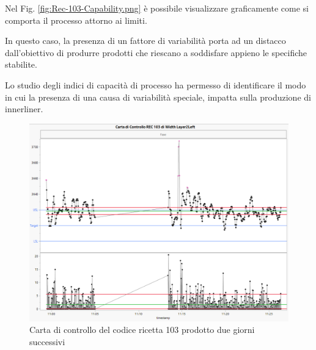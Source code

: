 Nel Fig. \ref{fig:Rec-103-Capability.png} è possibile visualizzare graficamente come si comporta il processo attorno ai limiti.

In questo caso, la presenza di un fattore di variabilità porta ad un distacco dall'obiettivo di produrre prodotti che riescano a soddisfare appieno le specifiche stabilite.

Lo studio degli indici di capacità di processo ha permesso di identificare il modo in cui la presenza di una causa di variabilità speciale, impatta sulla produzione di innerliner.

\clearpage
\begin{figure}[h]
  \centering
  \includegraphics[width=1 \textwidth]{img/Rec-103-ControlChart.png}
  \caption{Carta di controllo del codice ricetta 103 prodotto due giorni successivi}
  \label{fig:Rec-103-ControlChart.png}
\end{figure}


